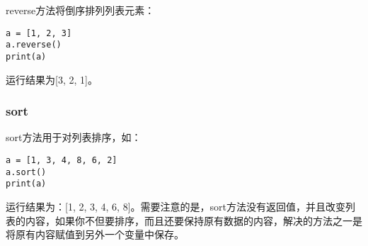 reverse方法将倒序排列列表元素：

\begin{lstlisting}
a = [1, 2, 3]
a.reverse()
print(a)
\end{lstlisting}

运行结果为[3, 2, 1]。

\subsubsection{sort}
sort方法用于对列表排序，如：

\begin{lstlisting}
a = [1, 3, 4, 8, 6, 2]
a.sort()
print(a)
\end{lstlisting}

运行结果为：[1, 2, 3, 4, 6, 8]。需要注意的是，sort方法没有返回值，并且改变列表的内容，如果你不但要排序，而且还要保持原有数据的内容，解决的方法之一是将原有内容赋值到另外一个变量中保存。
